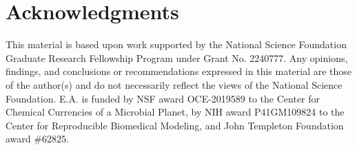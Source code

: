 \documentclass{article}
\begin{document}
\section*{Acknowledgments}

This material is based upon work supported by the National Science Foundation Graduate Research Fellowship Program under Grant No. 2240777. Any opinions, findings, and conclusions or recommendations expressed in this material are those of the author(s) and do not necessarily reflect the views of the National Science Foundation. E.A. is funded by NSF award OCE-2019589 to the Center for Chemical Currencies of a Microbial Planet, by NIH award P41GM109824 to the Center for Reproducible Biomedical Modeling, and John Templeton Foundation award \#62825.

  

\end{document}
